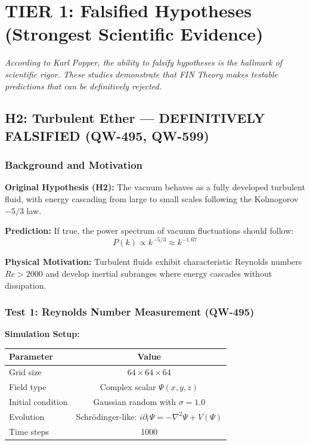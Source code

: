 \documentclass[11pt,a4paper]{book}
\theoremstyle{remark}
\begin{document}
\section{TIER 1: Falsified Hypotheses (Strongest Scientific Evidence)}

\textit{According to Karl Popper, the ability to falsify hypotheses is the hallmark of scientific rigor. These studies demonstrate that FIN Theory makes testable predictions that can be definitively rejected.}

\subsection{H2: Turbulent Ether --- DEFINITIVELY FALSIFIED (QW-495, QW-599)}

\subsubsection{Background and Motivation}

\textbf{Original Hypothesis (H2):} The vacuum behaves as a fully developed turbulent fluid, with energy cascading from large to small scales following the Kolmogorov $-5/3$ law.

\textbf{Prediction:} If true, the power spectrum of vacuum fluctuations should follow:
\begin{equation}
P(k) \propto k^{-5/3} \approx k^{-1.67}
\end{equation}

\textbf{Physical Motivation:} Turbulent fluids exhibit characteristic Reynolds numbers $Re > 2000$ and develop inertial subranges where energy cascades without dissipation.

\subsubsection{Test 1: Reynolds Number Measurement (QW-495)}

\textbf{Simulation Setup:}
\begin{table}[H]
\centering
\begin{tabular}{|l|c|}
\hline
\textbf{Parameter} & \textbf{Value} \\
\hline
Grid size & $64 \times 64 \times 64$ \\
Field type & Complex scalar $\Psi(x,y,z)$ \\
Initial condition & Gaussian random with $\sigma = 1.0$ \\
Evolution & Schrödinger-like: $i\partial_t\Psi = -\nabla^2\Psi + V(\Psi)$ \\
Time steps & 1000 \\
\hline
\end{tabular}
\end{table}
\end{document}
